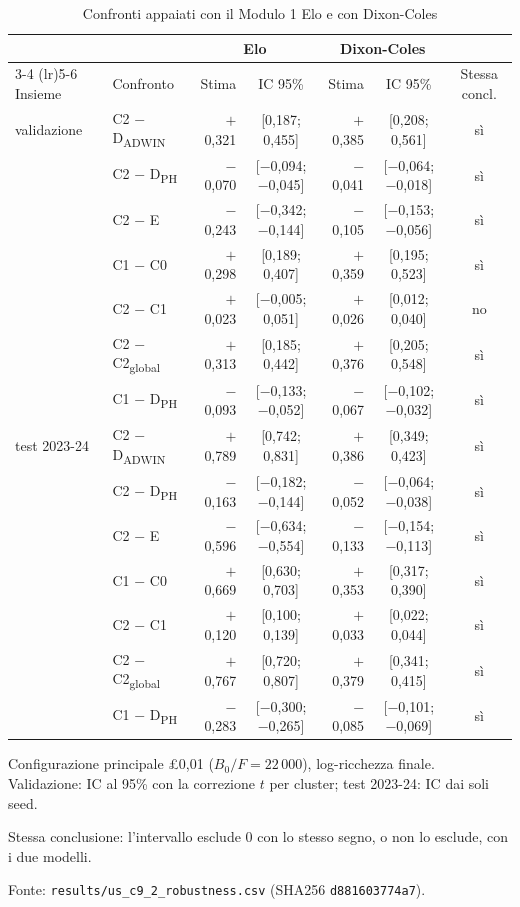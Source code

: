 \begin{table}[htbp]
\centering
\small
\setlength{\tabcolsep}{4pt}
\caption{Confronti appaiati con il Modulo 1 Elo e con Dixon-Coles}
\label{tab:s11_confronti_dc}
\begin{tabular}{llrcrcc}
\toprule
 &  & \multicolumn{2}{c}{Elo} & \multicolumn{2}{c}{Dixon-Coles} &  \\
\cmidrule(lr){3-4} \cmidrule(lr){5-6}
Insieme & Confronto & Stima & IC 95\% & Stima & IC 95\% & Stessa concl. \\
\midrule
validazione & C2 $-$ D\textsubscript{ADWIN} & $+$0,321 & [0,187; 0,455] & $+$0,385 & [0,208; 0,561] & sì \\
 & C2 $-$ D\textsubscript{PH} & $-$0,070 & [$-$0,094; $-$0,045] & $-$0,041 & [$-$0,064; $-$0,018] & sì \\
 & C2 $-$ E & $-$0,243 & [$-$0,342; $-$0,144] & $-$0,105 & [$-$0,153; $-$0,056] & sì \\
 & C1 $-$ C0 & $+$0,298 & [0,189; 0,407] & $+$0,359 & [0,195; 0,523] & sì \\
 & C2 $-$ C1 & $+$0,023 & [$-$0,005; 0,051] & $+$0,026 & [0,012; 0,040] & no \\
 & C2 $-$ C2\textsubscript{global} & $+$0,313 & [0,185; 0,442] & $+$0,376 & [0,205; 0,548] & sì \\
 & C1 $-$ D\textsubscript{PH} & $-$0,093 & [$-$0,133; $-$0,052] & $-$0,067 & [$-$0,102; $-$0,032] & sì \\
\midrule
test 2023-24 & C2 $-$ D\textsubscript{ADWIN} & $+$0,789 & [0,742; 0,831] & $+$0,386 & [0,349; 0,423] & sì \\
 & C2 $-$ D\textsubscript{PH} & $-$0,163 & [$-$0,182; $-$0,144] & $-$0,052 & [$-$0,064; $-$0,038] & sì \\
 & C2 $-$ E & $-$0,596 & [$-$0,634; $-$0,554] & $-$0,133 & [$-$0,154; $-$0,113] & sì \\
 & C1 $-$ C0 & $+$0,669 & [0,630; 0,703] & $+$0,353 & [0,317; 0,390] & sì \\
 & C2 $-$ C1 & $+$0,120 & [0,100; 0,139] & $+$0,033 & [0,022; 0,044] & sì \\
 & C2 $-$ C2\textsubscript{global} & $+$0,767 & [0,720; 0,807] & $+$0,379 & [0,341; 0,415] & sì \\
 & C1 $-$ D\textsubscript{PH} & $-$0,283 & [$-$0,300; $-$0,265] & $-$0,085 & [$-$0,101; $-$0,069] & sì \\
\bottomrule
\end{tabular}

\smallskip
\begin{minipage}{\linewidth}
\footnotesize
Configurazione principale \pounds{}0,01 ($B_0/F = 22\,000$), log-ricchezza finale. Validazione: IC al 95\% con la correzione $t$ per cluster; test 2023-24: IC dai soli seed.\par
Stessa conclusione: l'intervallo esclude 0 con lo stesso segno, o non lo esclude, con i due modelli.\par
Fonte: \texttt{results/us\_c9\_2\_robustness.csv} (SHA256 \texttt{d881603774a7}).
\end{minipage}
\end{table}
